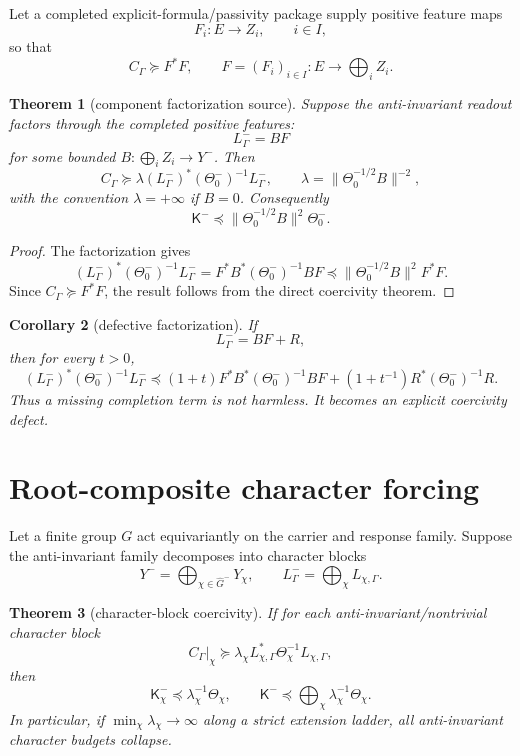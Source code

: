 \documentclass[11pt]{article}
\newtheorem{theorem}{Theorem}
\newtheorem{corollary}[theorem]{Corollary}
\begin{document}
Let a completed explicit-formula/passivity package supply positive feature maps
\[
  F_i:E\to Z_i,
  \qquad i\in I,
\]
so that
\[
  C_\Gamma\succeq F^*F,
  \qquad F=(F_i)_{i\in I}:E\to\bigoplus_i Z_i.
\]

\begin{theorem}[component factorization source]
Suppose the anti-invariant readout factors through the completed positive features:
\[
  L^-_\Gamma=B F
\]
for some bounded \(B:\bigoplus_i Z_i\to Y^-\).  Then
\[
  C_\Gamma\succeq \lambda (L^-_\Gamma)^*(\Theta^-_0)^{-1}L^-_\Gamma,
  \qquad
  \lambda=\|\Theta_0^{-1/2}B\|^{-2},
\]
with the convention \(\lambda=+\infty\) if \(B=0\).  Consequently
\[
  \mathsf K^-\preceq \|\Theta_0^{-1/2}B\|^2\Theta^-_0.
\]
\end{theorem}

\begin{proof}
The factorization gives
\[
  (L^-_\Gamma)^*(\Theta^-_0)^{-1}L^-_\Gamma
  =F^*B^*(\Theta^-_0)^{-1}BF
  \preceq
  \|\Theta_0^{-1/2}B\|^2F^*F.
\]
Since \(C_\Gamma\succeq F^*F\), the result follows from the direct coercivity theorem.
\end{proof}

\begin{corollary}[defective factorization]
If
\[
  L^-_\Gamma=BF+R,
\]
then for every \(t>0\),
\[
  (L^-_\Gamma)^*(\Theta^-_0)^{-1}L^-_\Gamma
  \preceq
  (1+t)F^*B^*(\Theta^-_0)^{-1}BF
  +(1+t^{-1})R^*(\Theta^-_0)^{-1}R.
\]
Thus a missing completion term is not harmless.  It becomes an explicit coercivity defect.
\end{corollary}

\section{Root-composite character forcing}
Let a finite group \(G\) act equivariantly on the carrier and response family.  Suppose the anti-invariant family decomposes into character blocks
\[
  Y^- = \bigoplus_{\chi\in\widehat G^-}Y_\chi,
  \qquad
  L^-_\Gamma=\bigoplus_\chi L_{\chi,\Gamma}.
\]

\begin{theorem}[character-block coercivity]
If for each anti-invariant/nontrivial character block
\[
  C_\Gamma|_\chi\succeq \lambda_\chi L_{\chi,\Gamma}^*\Theta_\chi^{-1}L_{\chi,\Gamma},
\]
then
\[
  \mathsf K^-_\chi\preceq \lambda_\chi^{-1}\Theta_\chi,
  \qquad
  \mathsf K^-\preceq \bigoplus_\chi \lambda_\chi^{-1}\Theta_\chi.
\]
In particular, if \(\min_\chi\lambda_\chi\to\infty\) along a strict extension ladder, all anti-invariant character budgets collapse.
\end{theorem}
\end{document}
